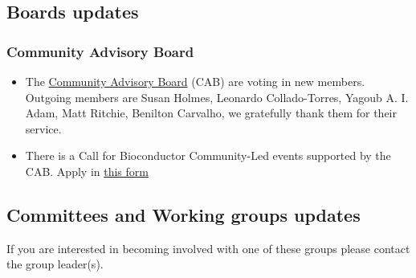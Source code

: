 \hypertarget{boards-updates}{%
\subsection{Boards updates}\label{boards-updates}}

\hypertarget{community-advisory-board}{%
\subsubsection{Community Advisory Board}\label{community-advisory-board}}

\begin{itemize}
\item
  The \href{https://bioconductor.org/about/community-advisory-board/}{Community Advisory Board} (CAB) are voting in new members. Outgoing members are Susan Holmes, Leonardo Collado-Torres, Yagoub A. I. Adam, Matt Ritchie, Benilton Carvalho, we gratefully thank them for their service.
\item
  There is a Call for Bioconductor Community-Led events supported by the CAB.
  Apply in \href{https://forms.gle/oTHp26TG3eP9q4eE7}{this form}
\end{itemize}

\hypertarget{committees-and-working-groups-updates}{%
\subsection{Committees and Working groups updates}\label{committees-and-working-groups-updates}}

If you are interested in becoming involved with one of these groups please contact the group leader(s).

